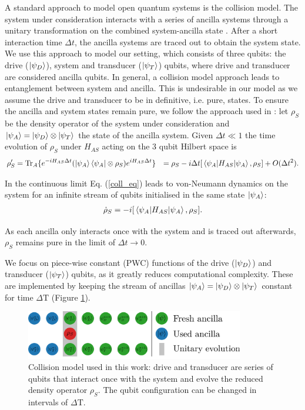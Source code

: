A standard approach to model open quantum systems is the collision model.
The system under consideration interacts with a series of ancilla systems through a unitary transformation on the combined system-ancilla state \cite{Lorenzo_2017}. After a short interaction time $\Delta t$, the ancilla systems are traced out to obtain the system state.
We use this approach to model our setting, which consists of three qubits: the drive ($\ket{\psi_D}$), system and transducer ($\ket{\psi_T}$) qubits, where drive and transducer are considered ancilla qubits.
In general, a collision model approach leads to entanglement between system and ancilla.
This is undesirable in our model as we assume the drive and transducer to be in definitive, i.e. pure, states.
To ensure the ancilla and system states remain pure, we follow the approach used in \cite{beyer2020}:
let $\rho_S$ be the density operator of the system under consideration and $\ket{\psi_A} = \ket{\psi_D} \otimes \ket{\psi_T}$ the state of the ancilla system.
Given $\Delta t \ll 1$ the time evolution of $\rho_S$ under $H_{AS}$ acting on the 3 qubit Hilbert space is
\begin{align}\label{coll_eq}
\rho'_S & = \mathrm{Tr}_A \{ e^{-i H_{AS} \Delta t} (\ket{\psi_A} \bra{\psi_A} \otimes \rho_S) e^{i H_{AS} \Delta t} \} & = \rho_S - i \Delta t [\expval{H_{AS}}{\psi_A}, \rho_S] + O(\Delta t^2).
\end{align}

In the continuous limit Eq. (\ref{coll_eq}) leads to von-Neumann dynamics on the system for an infinite stream of qubits initialised in the same state $\ket{\psi_A}$:
\begin{align*}
	\dot{\rho}_S = - i [\expval{H_{AS}}{\psi_A}, \rho_S].
\end{align*}

As each ancilla only interacts once with the system and is traced out afterwards, $\rho_S$ remains pure in the limit of $\Delta t \to 0$.

We focus on piece-wise constant (PWC) functions of the drive ($\ket{\psi_D}$) and transducer ($\ket{\psi_T}$) qubits, as it greatly reduces computational complexity.
These are implemented by keeping the stream of ancillas $\ket{\psi_A} = \ket{\psi_D} \otimes \ket{\psi_T}$ constant for time $\Delta \mathrm{T}$ (Figure \ref{collmodel}).

\begin{figure}[h]
	\centering
	\includegraphics[width=0.85\textwidth]{img/coll2}
	\caption{Collision model used in this work: drive and transducer are series of qubits that interact once with the system and evolve the reduced density operator $\rho_S$. The qubit configuration can be changed in intervals of $\Delta \mathrm{T}$.}
	\label{collmodel}
\end{figure}

